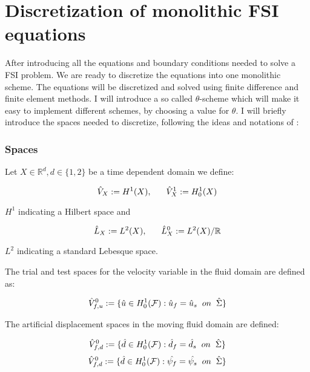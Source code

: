 \section{Discretization of monolithic FSI equations}\label{Discretization}
After introducing all the equations and boundary conditions needed to solve a FSI problem. We are ready to discretize the equations into one monolithic scheme. The equations will be discretized and solved using finite difference and finite element methods. I will introduce a so called $\theta$-scheme which will make it easy to implement different schemes, by choosing a value for $\theta$.
I will briefly introduce the spaces needed to discretize, following the ideas and notations of \cite{Wick2011}:

\subsubsection{Spaces}
Let $ X \in \mathbb{R}^d , d \in\{ 1,2  \} $ be a time dependent domain we define:

\begin{equation}
\hat{V}_X := H^1(X), \hspace{6mm}  \hat{V}^1_X := H^1_0(X) 
\end{equation}

$ H^1 $ indicating a Hilbert space and

\begin{equation}
\hat{L}_X := L^2(X), \hspace{6mm} \hat{L}^0_X := L^2(X) / \mathbb{R}
\end{equation}

$L^2$ indicating a standard Lebesque space.

The trial and test spaces for the velocity variable in the fluid domain are defined as:

\begin{equation}
\hat{V}^0_{f,u} := \{ \hat{u} \in H^1_0(\mathcal{F}) : \hat{u}_f = \hat{u}_s \hspace{2mm} on \hspace{2mm} \hat{\Sigma}  \}
\end{equation}

The artificial displacement spaces in the moving fluid domain are defined:

\begin{equation}
\hat{V}^0_{f,d} := \{ \hat{d} \in H^1_0(\mathcal{F}) : \hat{d}_f = \hat{d}_s \hspace{2mm} on \hspace{2mm} \hat{\Sigma}  \}
\end{equation}
\begin{equation}
\hat{V}^0_{f,d} := \{ \hat{d} \in H^1_0(\mathcal{F}) : \hat{\psi_f} = \hat{\psi_s} \hspace{2mm} on \hspace{2mm} \hat{\Sigma}  \}
\end{equation}



